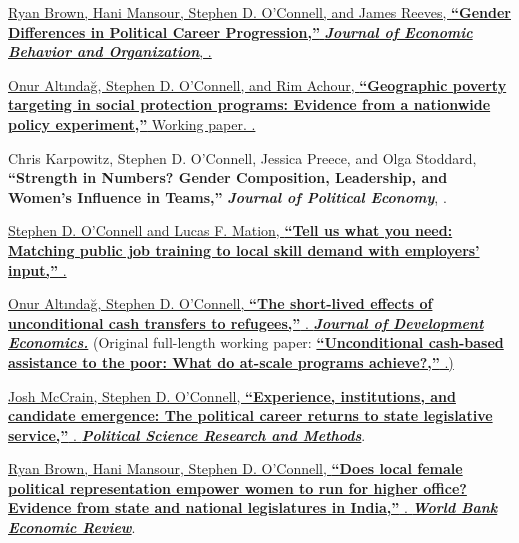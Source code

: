\documentclass[letterpaper,10pt,oneside]{article}
\begin{document}
\begin{body}
\BigEntryGapNoBreak
\href{https://www.stephenoconnell.org/files/BMOR_CareerPathGenderGap.pdf}
{Ryan Brown, Hani Mansour, Stephen D. O'Connell, and James Reeves, \textbf{``Gender Differences in Political Career Progression,''} \textbf{\textit{Journal of Economic Behavior and Organization}}, .}

\BigEntryGapNoBreak
\href{https://www.stephenoconnell.org/files/AOC_EfficiencyVsEffectiveness.pdf}
{Onur Altındağ, Stephen D. O'Connell, and Rim Achour, \textbf{``Geographic poverty targeting in social protection programs: Evidence from a nationwide policy experiment,''} Working paper. .}

\BigEntryGapNoBreak
Chris Karpowitz, Stephen D. O'Connell, Jessica Preece, and Olga Stoddard, \textbf{``Strength in Numbers? Gender Composition, Leadership, and Women's Influence in Teams,''} \textbf{\textit{Journal of Political Economy}}, .

\BigEntryGapNoBreak
\href{https://www.stephenoconnell.org/files/OM_MakingJobTrainingWork.pdf}
{Stephen D. O'Connell and Lucas F. Mation, \textbf{``Tell us what you need: Matching public job training to local skill demand with employers' input,''} . }

\BigEntryGapNoBreak
\href{https://www.stephenoconnell.org/files/AOC_RefugeeAidEfx_2021.pdf}
{Onur Altındağ, Stephen D. O'Connell, \textbf{``The short-lived effects of unconditional cash transfers to refugees,''} . \textbf{\textit{Journal of Development Economics.}}}
(Original full-length working paper: \href{https://www.stephenoconnell.org/files/AOC_RefugeeAidEfx.pdf}
{\textbf{``Unconditional cash-based assistance to the poor: What do at-scale programs achieve?,''} .)}


\BigEntryGapNoBreak
\href{https://www.stephenoconnell.org/files/McOC_LegislativeCareers.pdf}
{Josh McCrain, Stephen D. O'Connell, \textbf{``Experience, institutions, and candidate emergence: The political career returns to state legislative service,''} . \textbf{\textit{Political Science Research and Methods}}}.

\BigEntryGapNoBreak
\href{https://www.stephenoconnell.org/files/BMO_IndiaElectionsCareers.pdf}
{Ryan Brown, Hani Mansour, Stephen D. O'Connell, \textbf{``Does local female political representation empower women to run for higher office? Evidence from state and national legislatures in India,''} . \textbf{\textit{World Bank Economic Review}}}.



\end{body}
\end{document}
